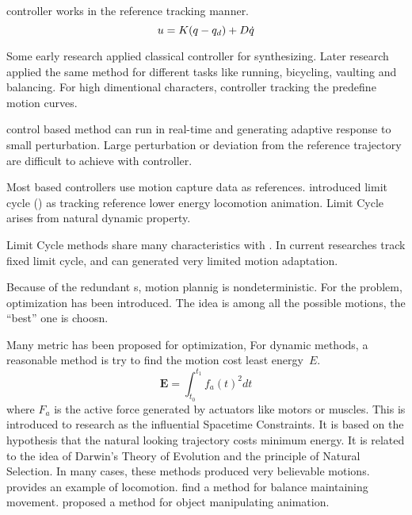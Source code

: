 \begin{itemize}

\pd controller works in the reference tracking manner.
\begin{equation}
\label{eq:pdcontrol}
u=K(q -q_d)+D\dot{q}
\end{equation}

Some early research applied classical \pd controller \citep{Raibert1991} for synthesizing.
Later research \citep{Hodgins1995} applied the same method for different tasks like running, bicycling, vaulting and balancing. 
For high dimentional characters, \pd controller tracking the predefine motion curves\citep{Yin2007}.

\pd control based method can run in real-time and generating adaptive response to small perturbation.
Large perturbation or deviation from the reference trajectory are difficult to achieve with \pd controller.








Most \pd based controllers use motion capture data as references.
\citet{Laszlo1996} introduced limit cycle (\lc) as tracking reference lower energy locomotion animation. 
Limit Cycle arises from natural dynamic property.

Limit Cycle methods share many characteristics with \pd.
In current researches\citep{Coros2009,Laszlo1996} track fixed limit cycle, and can generated very limited motion adaptation.



 


Because of the redundant \dof s, motion plannig is nondeterministic.
For the problem, optimization has been introduced.
The idea is among all the possible motions, the ``best'' one is choosn.

Many metric has been proposed for optimization, 
For dynamic methods, a reasonable method is try to find the motion cost least energy~$E$. 
\begin{equation}
 \textbf{E}=\int_{t_0}^{t_1}f_{a}(t)^2dt
\end{equation}
where $F_{a}$ is the active force generated by actuators like motors or muscles. 
This is introduced to \cms research as the influential Spacetime Constraints\citep{Witkin1988}. 
It is based on the hypothesis that the natural looking trajectory costs minimum energy. 
It is related to the idea of Darwin's Theory of Evolution and the principle of Natural Selection. 
In many cases, these methods produced very believable motions. 
\citet{Jain2009} provides an example of locomotion.  
\citet{BalanceControl} find a method for balance maintaining movement. 
\citet{Liu2009} proposed a method for object manipulating animation. 
\end{itemize}

